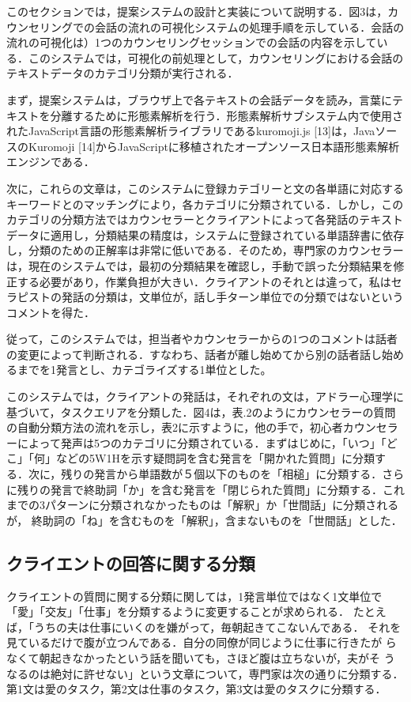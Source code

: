 \documentclass[shuuron]{kuee}
\begin{document}
  このセクションでは，提案システムの設計と実装について説明する．図3は，カウンセリングでの会話の流れの可視化システムの処理手順を示している．会話の流れの可視化は）1つのカウンセリングセッションでの会話の内容を示している．このシステムでは，可視化の前処理として，カウンセリングにおける会話のテキストデータのカテゴリ分類が実行される．


まず，提案システムは，ブラウザ上で各テキストの会話データを読み，言葉にテキストを分離するために形態素解析を行う．形態素解析サブシステム内で使用されたJavaScript言語の形態素解析ライブラリであるkuromoji.js [13]は，JavaソースのKuromoji [14]からJavaScriptに移植されたオープンソース日本語形態素解析エンジンである．

  次に，これらの文章は，このシステムに登録カテゴリーと文の各単語に対応するキーワードとのマッチングにより，各カテゴリに分類されている．しかし，このカテゴリの分類方法ではカウンセラーとクライアントによって各発話のテキストデータに適用し，分類結果の精度は，システムに登録されている単語辞書に依存し，分類のための正解率は非常に低いである．そのため，専門家のカウンセラーは，現在のシステムでは，最初の分類結果を確認し，手動で誤った分類結果を修正する必要があり，作業負担が大きい．クライアントのそれとは違って，私はセラピストの発話の分類は，文単位が，話し手ターン単位での分類ではないというコメントを得た．


  従って，このシステムでは，担当者やカウンセラーからの1つのコメントは話者の変更によって判断される．すなわち、話者が離し始めてから別の話者話し始めるまでを1発言とし、カテゴライズする1単位とした。

  このシステムでは，クライアントの発話は，それぞれの文は，アドラー心理学に基づいて，タスクエリアを分類した．図4は，表.2のようにカウンセラーの質問の自動分類方法の流れを示し，表2に示すように，他の手で，初心者カウンセラーによって発声は5つのカテゴリに分類されている．まずはじめに，「いつ」「どこ」「何」などの5W1Hを示す疑問詞を含む発言を「開かれた質問」に分類する．次に，残りの発言から単語数が５個以下のものを「相槌」に分類する．さらに残りの発言で終助詞「か」を含む発言を「閉じられた質問」に分類する．これまでの3パターンに分類されなかったものは「解釈」か「世間話」に分類されるが，
  終助詞の「ね」を含むものを「解釈」，含まないものを「世間話」とした．


\subsection{クライエントの回答に関する分類} %


クライエントの質問に関する分類に関しては，1発言単位ではなく1文単位で「愛」「交友」「仕事」を分類するように変更することが求められる．
たとえば，「うちの夫は仕事にいくのを嫌がって，毎朝起きてこないんである．
それを見ているだけで腹が立つんである．自分の同僚が同じように仕事に行きたが
らなくて朝起きなかったという話を聞いても，さほど腹は立ちないが，夫がそ
うなるのは絶対に許せない」という文章について，専門家は次の通りに分類する．第1文は愛のタスク，第2文は仕事のタスク，第3文は愛のタスクに分類する．
\end{document}
